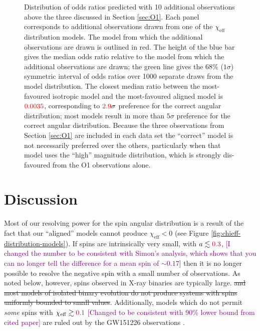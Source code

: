 \documentclass[modern,linenumbers]{aastex61}
\newcommand{\chieff}{\chi_\mathrm{eff}}
\newcommand{\checkme}[1]{\textcolor{red}{#1}}
\newcommand{\OTwoSigmaIsoAlignedMin}{\checkme{2.9}}
\newcommand{\OTwoOddsIsoAlignedMin}{\checkme{0.0035}}
\newcommand{\ilya}[1]{\textcolor{purple}{#1}}
\begin{document}
\begin{figure}
  \caption{\label{fig:O2-predictions} Distribution of odds ratios
    predicted with 10 additional observations above the three
    discussed in Section \ref{sec:O1}.  Each panel corresponds to
    additional observations drawn from one of the $\chieff$
    distribution models.  The model from which the additional
    observations are drawn is outlined in red.  The height of the blue
    bar gives the median odds ratio relative to the model from which
    the additional observations are drawn; the green line gives the
    68\% ($1 \sigma$) symmetric interval of odds ratios over 1000
    separate draws from the model distribution.  The closest median
    ratio between the most-favoured isotropic model and the
    most-favoured aligned model is $\OTwoOddsIsoAlignedMin$,
    corresponding to $\OTwoSigmaIsoAlignedMin\sigma$ preference for
    the correct angular distribution; most models result in more than
    $5\sigma$ preference for the correct angular distribution.
    Because the three observations from Section \ref{sec:O1} are
    included in each data set the ``correct'' model is not necessarily
    preferred over the others, particularly when that model uses the
    ``high'' magnitude distribution, which is strongly dis-favoured
    from the O1 observations alone.}
\end{figure}

\section{Discussion}
\label{sec:discussion}

Most of our resolving power for the spin angular distribution is a
result of the fact that our ``aligned'' models cannot produce
$\chieff < 0$ (see Figure \ref{fig:chieff-distribution-models}).  If
spins are intrinsically very small, with $a \lesssim \ilya{0.3}$, \ilya{[I changed the number to be consistent with Simon's analysis, which shows that you can no longer tell the difference for a mean spin of $\sim 0.17$]} then
it is no longer possible to resolve the negative spin with a small
number of observations.  As noted below, however, spins observed in
X-ray binaries are typically large. 
\sout{and most models of isolated binary evolution do not produce systems with spins uniformly bounded to small values}.  
Additionally, models which do not permit \emph{some} spins
with $\chieff \gtrsim \ilya{0.1}$ \ilya{[Changed to be consistent with 90\% lower bound from cited paper]} are ruled out by the GW151226 observations
\citep{2016PhRvL.116x1103A}.  
\end{document}
